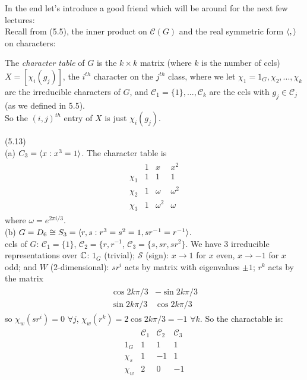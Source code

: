 \documentclass[a4paper]{article}
\begin{document}
In the end let's introduce a good friend which will be around for the next few lectures:\\
Recall from (5.5), the inner product on $\mathcal{C}(G)$ and the real symmetric form $\langle,\rangle$ on characters:
\begin{defi}
The \emph{character table} of $G$ is the $k \times k$ matrix (where $k$ is the number of ccls) $X = [\chi_i (g_j)]$, the $i^{th}$ character on the $j^{th}$ class, where we let $\chi_1 =1_G, \chi_2,...,\chi_k$ are the irreducible characters of $G$, and $\mathcal{C}_1 =\{1\},...,\mathcal{C}_k$ are the ccls with $g_j \in \mathcal{C}_j$ (as we defined in 5.5).\\
So the $(i,j)^{th}$ entry of $X$ is just $\chi_i (g_j)$.
\end{defi}

\begin{eg} (5.13)\\
(a) $C_3 = \langle x:x^3=1\rangle$. The character table is
\begin{equation*}
\begin{aligned}
\begin{matrix}
 & 1 & x & x^2\\
\chi_1 & 1 & 1 & 1\\
\chi_2 & 1 & \omega & \omega^2\\
\chi_3 & 1 & \omega^2 & \omega
\end{matrix}
\end{aligned}
\end{equation*}
where $\omega = e^{2\pi i/3}$.\\
(b) $G=D_6 \cong S_3 = \langle r,s:r^3=s^2=1,sr^{-1} = r^{-1}\rangle$.\\
ccls of $G$: $\mathcal{C}_1 = \{1\}$, $\mathcal{C}_2 = \{r,r^{-1}$, $\mathcal{C}_3 =\{s,sr,sr^2\}$. We have 3 irreducible representations over $\mathbb{C}$: $1_G$ (trivial); $\mathcal{S}$ (sign): $x \to 1$ for $x$ even, $x \to -1$ for $x$ odd; and $W$ (2-dimensional): $sr^i$ acts by matrix with eigenvalues $\pm 1$; $r^k$ acts by the matrix
\begin{equation*}
\begin{aligned}
\begin{matrix}
\cos 2k\pi/3 & -\sin 2k\pi/3\\
\sin 2k\pi/3 & \cos 2k\pi/3
\end{matrix}
\end{aligned}
\end{equation*}
so $\chi_w(sr^i) = 0$ $\forall j$, $\chi_w (r^k) = 2\cos 2k\pi/3 = -1$ $\forall k$. So the charactable is:
\begin{equation*}
\begin{aligned}
\begin{matrix}
 & \mathcal{C}_1 & \mathcal{C}_2 & \mathcal{C}_3\\
 1_G & 1 & 1 & 1\\
 \chi_s & 1 & -1 & 1\\
 \chi_w & 2 & 0 & -1
\end{matrix}
\end{aligned}
\end{equation*}
\end{eg}
\end{document}

